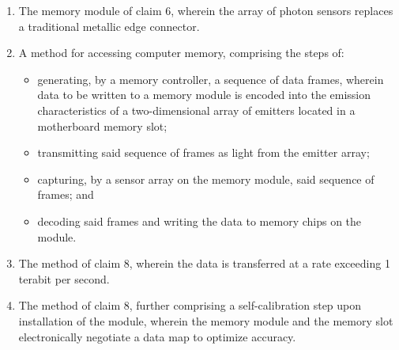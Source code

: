\documentclass[11pt,letterpaper]{article}
\begin{document}
\begin{enumerate}[label=\textbf{\arabic*.}, leftmargin=0.5in, itemsep=0.4cm]
    \item The memory module of claim 6, wherein the array of photon sensors replaces a traditional metallic edge connector.

    \item A method for accessing computer memory, comprising the steps of:
    \begin{itemize}[leftmargin=0.3in, noitemsep]
        \item generating, by a memory controller, a sequence of data frames, wherein data to be written to a memory module is encoded into the emission characteristics of a two-dimensional array of emitters located in a motherboard memory slot;
        \item transmitting said sequence of frames as light from the emitter array;
        \item capturing, by a sensor array on the memory module, said sequence of frames; and
        \item decoding said frames and writing the data to memory chips on the module.
    \end{itemize}

    \item The method of claim 8, wherein the data is transferred at a rate exceeding 1 terabit per second.

    \item The method of claim 8, further comprising a self-calibration step upon installation of the module, wherein the memory module and the memory slot electronically negotiate a data map to optimize accuracy.
\end{enumerate}
\end{document}
